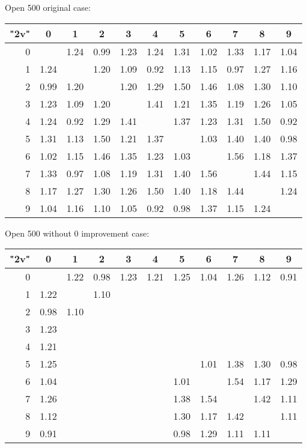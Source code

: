\begin{table}
	
	Open 500 original case:
		
	\vspace{0.6cm}
	
	
	\begin{tabular}{|r||c|c|c|c|c|c|c|c|c|c|}\hline
		{\bf "2v"} & 0 & 1 & 2 & 3 & 4 & 5 & 6 & 7 & 8 & 9 \\\hline\hline
		0 & &1.24 &0.99 &1.23 &1.24 &1.31 &1.02 &1.33 &1.17 &1.04  \\\hline
		1 &1.24 & &1.20 &1.09 &0.92 &1.13 &1.15 &0.97 &1.27 &1.16  \\\hline
		2 &0.99 &1.20 & &1.20 &1.29 &1.50 &1.46 &1.08 &1.30 &1.10  \\\hline
		3 &1.23 &1.09 &1.20 & &1.41 &1.21 &1.35 &1.19 &1.26 &1.05  \\\hline
		4 &1.24 &0.92 &1.29 &1.41 & &1.37 &1.23 &1.31 &1.50 &0.92  \\\hline
		5 &1.31 &1.13 &1.50 &1.21 &1.37 & &1.03 &1.40 &1.40 &0.98  \\\hline
		6 &1.02 &1.15 &1.46 &1.35 &1.23 &1.03 & &1.56 &1.18 &1.37  \\\hline
		7 &1.33 &0.97 &1.08 &1.19 &1.31 &1.40 &1.56 & &1.44 &1.15  \\\hline
		8 &1.17 &1.27 &1.30 &1.26 &1.50 &1.40 &1.18 &1.44 & &1.24  \\\hline
		9 &1.04 &1.16 &1.10 &1.05 &0.92 &0.98 &1.37 &1.15 &1.24 &  \\\hline
	\end{tabular}
	
		\vspace{0.6cm}
	
		Open 500 without 0 improvement case:
	
	\vspace{0.6cm}
	
	
	\begin{tabular}{|r||c|c|c|c|c|c|c|c|c|c|}\hline
		{\bf "2v"} & 0 & 1 & 2 & 3 & 4 & 5 & 6 & 7 & 8 & 9 \\\hline\hline
0 & &1.22 &0.98 &1.23 &1.21 &1.25 &1.04 &1.26 &1.12 &0.91  \\\hline
1 &1.22 & &1.10 & & & & & & &  \\\hline
2 &0.98 &1.10 & & & & & & & &  \\\hline
3 &1.23 & & & & & & & & &  \\\hline
4 &1.21 & & & & & & & & &  \\\hline
5 &1.25 & & & & & &1.01 &1.38 &1.30 &0.98  \\\hline
6 &1.04 & & & & &1.01 & &1.54 &1.17 &1.29  \\\hline
7 &1.26 & & & & &1.38 &1.54 & &1.42 &1.11  \\\hline
8 &1.12 & & & & &1.30 &1.17 &1.42 & &1.11  \\\hline
9 &0.91 & & & & &0.98 &1.29 &1.11 &1.11 &  \\\hline
	\end{tabular}
	

\end{table}

